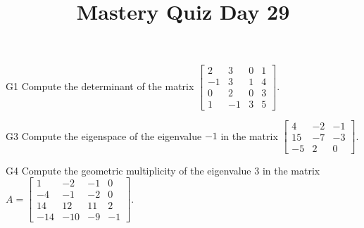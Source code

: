\documentclass{sbgLAquiz}
\title{Mastery Quiz Day 29 }
\begin{document}
\begin{problem}{G1}
Compute the determinant of the matrix $\begin{bmatrix} 2 & 3 & 0 & 1 \\ -1 & 3 & 1 & 4 \\ 0 & 2 & 0 & 3 \\ 1 & -1 & 3 & 5 \end{bmatrix}$.
\end{problem}

\begin{problem}{G3}
Compute the eigenspace of the eigenvalue $-1$ in the matrix $\begin{bmatrix} 4 & -2 & -1 \\ 15 & -7 & -3 \\ -5 & 2 & 0 \end{bmatrix}$.
\end{problem}
\newpage

\begin{problem}{G4}
Compute the geometric multiplicity of the eigenvalue $3$ in the matrix $A=\begin{bmatrix}1 & -2 & -1 & 0 \\ -4 & -1 & -2 & 0 \\ 14 & 12 & 11 & 2 \\ -14 & -10 & -9 & -1\end{bmatrix}$.
\end{problem}
\end{document}
